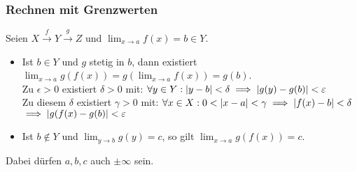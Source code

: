 \subsubsection{Rechnen mit Grenzwerten}
Seien $X \xrightarrow{f} Y \xrightarrow{g} Z$ und  $\lim_{x \rightarrow a} f(x) = b \in Y$.\\
\begin{itemize}
	\item Ist $b \in Y$ und $g$ stetig in $b$, dann existiert $\lim_{x \rightarrow a} g(f(x)) = g(\lim_{x \rightarrow a} f(x)) = g(b)$. \\
		Zu $\epsilon > 0$ existiert $\delta > 0$ mit: $\forall y \in Y : \abs{y-b} < \delta \implies \abs{g(y)-g(b)} < \epsilon$ \\
		Zu diesem $\delta$ existiert $\gamma > 0$ mit: $\forall x \in X : 0 < \abs{x-a} < \gamma \implies \abs{f(x)-b} < \delta$ \\
		$\implies \abs{g(f(x)-g(b)} < \epsilon$ \\
	\item Ist $b \notin Y$ und $\lim_{y \rightarrow b} g(y) = c$, so gilt $\lim_{x \rightarrow a} g(f(x)) = c$.
\end{itemize}
\begin{bem}
	Dabei dürfen $a, b, c$ auch $\pm \infty$ sein.
\end{bem}
